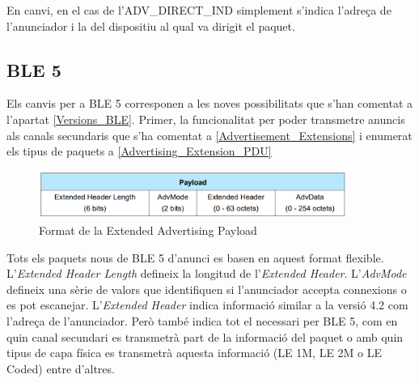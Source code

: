 En canvi, en el cas de l'ADV\_DIRECT\_IND simplement s'indica l'adreça de l'anunciador i la del dispositiu al qual va dirigit el paquet.

\subsection{BLE 5}
Els canvis per a BLE 5 corresponen a les noves possibilitats que s'han comentat a l'apartat \ref{Versions_BLE}.
Primer, la funcionalitat per poder transmetre anuncis als canals secundaris que s'ha comentat a \ref{Advertisement_Extensions} i enumerat els tipus de paquets a \ref{Advertising_Extension_PDU}

\begin{figure}[!h]
	\begin{center}
		\includegraphics[width=0.9\textwidth]{./images/Common_Extended_Advertising_Payload_Format.png}
		\caption{Format de la Extended Advertising Payload \cite{BLE_5_Extended_Advertising}}
	\end{center}
\end{figure}

Tots els paquets nous de BLE 5 d'anunci es basen en aquest format flexible.
L'\textit{Extended Header Length} defineix la longitud de l'\textit{Extended Header}.
L'\textit{AdvMode} defineix una sèrie de valors que identifiquen si l'anunciador accepta connexions o es pot escanejar.
L'\textit{Extended Header} indica informació similar a la versió 4.2 com l'adreça de l'anunciador.
Però també indica tot el necessari per BLE 5, com en quin canal secundari es transmetrà part de la informació del paquet o amb quin tipus de capa física es transmetrà aquesta informació (LE 1M, LE 2M o LE Coded) entre d'altres.

